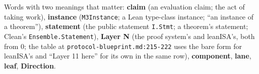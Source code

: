 \begin{sloppypar}
Words with two meanings that matter: \textbf{claim} (an evaluation claim; the act of taking work), \textbf{instance} (\texttt{M3Instance}; a Lean type-class instance; ``an instance of a theorem''), \textbf{statement} (the public statement \texttt{I.\allowbreak{}Stmt}; a theorem's statement; Clean's \texttt{Ensemble.\allowbreak{}Statement}), \textbf{Layer N} (the proof system's and leanISA's, both from 0; the table at \texttt{protocol-\allowbreak{}blueprint.\allowbreak{}md:\allowbreak{}215-\allowbreak{}222} uses the bare form for leanISA's and ``Layer 11 here'' for its own in the same row), \textbf{component}, \textbf{lane}, \textbf{leaf}, \textbf{Direction}.
\end{sloppypar}
